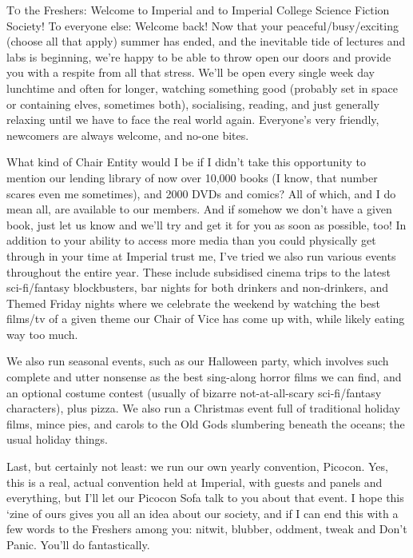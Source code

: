 \lettrine[lines=3]{T}{o} the Freshers: Welcome to Imperial and to Imperial College Science Fiction Society! To everyone else: Welcome back! Now that your peaceful/busy/exciting (choose all that apply) summer has ended, and the inevitable tide of lectures and labs is beginning, we’re happy to be able to throw open our doors and provide you with a respite from all that stress. We’ll be open every single week day lunchtime and often for longer, watching something good (probably set in space or containing elves, sometimes both), socialising, reading, and just generally relaxing until we have to face the real world again. Everyone’s very friendly, newcomers are always welcome, and no-one bites.

What kind of Chair Entity would I be if I didn’t take this opportunity to mention our lending library of now over 10,000 books (I know, that number scares even me sometimes), and 2000 DVDs and comics? All of which, and I do mean all, are available to our members. And if somehow we don’t have a given book, just let us know and we’ll try and get it for you as soon as possible, too! In addition to your ability to access more media than you could physically get through in your time at Imperial \textemdash{} trust me, I’ve tried \textemdash{} we also run various events throughout the entire year. These include subsidised cinema trips to the latest sci-fi/fantasy blockbusters, bar nights for both drinkers and non-drinkers, and Themed Friday nights where we celebrate the weekend by watching the best films/tv of a given theme our Chair of Vice has come up with, while likely eating way too much.

We also run seasonal events, such as our Halloween party, which involves such complete and utter nonsense as the best sing-along horror films we can find, and an optional costume contest (usually of bizarre not-at-all-scary sci-fi/fantasy characters), plus pizza. We also run a Christmas event full of traditional holiday films, mince pies, and carols to the Old Gods slumbering beneath the oceans; the usual holiday things.

Last, but certainly not least: we run our own yearly convention, Picocon. Yes, this is a real, actual convention held at Imperial, with guests and panels and everything, but I’ll let our Picocon Sofa\footnotemark{} talk to you about that event. I hope this ‘zine of ours gives you all an idea about our society, and if I can end this with a few words to the Freshers among you: nitwit, blubber, oddment, tweak \textemdash{} and Don’t Panic. You’ll do fantastically.
